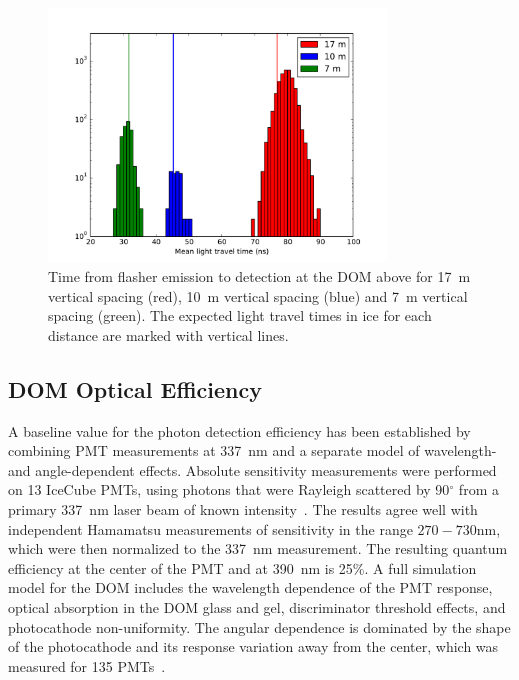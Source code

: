 \begin{figure}[!h]
  \captionsetup[subfigure]{labelformat=empty}
  \centering
  \includegraphics[width=0.8\textwidth]{graphics/dom/rapcal/flashmean.pdf}
  \caption{Time from flasher emission to detection at the DOM above for 17~m vertical spacing
    (red), 10~m vertical spacing (blue) and 7~m vertical spacing
    (green). The expected light travel times in ice for each distance are marked with
    vertical lines.}
  \label{fig:flashertiming}
\end{figure}

\subsection{\label{sec:domeff} DOM Optical Efficiency}

A baseline value for the photon detection efficiency has been established
by combining PMT measurements at 337~nm and a separate model of wavelength-
and angle-dependent effects.  Absolute sensitivity measurements were
performed on 13 IceCube PMTs, using photons that were Rayleigh scattered by
90$^{\circ}$ from a primary 337~nm laser beam of known
intensity~\cite{ICECUBE:PMT}. The results agree well with independent
Hamamatsu measurements of sensitivity in the range $270-730$nm, which
were then normalized to the 337~nm measurement.  The resulting quantum
efficiency at the center of the PMT and at 390~nm is 25\%.  A full
simulation model for the DOM includes the wavelength dependence of the PMT
response, optical absorption in the DOM glass and gel, discriminator
threshold effects, and photocathode non-uniformity.  The angular dependence is
dominated by the shape of the photocathode and its response variation away
from the center, which was measured for 135 PMTs~\cite{ICECUBE:PMT}.

